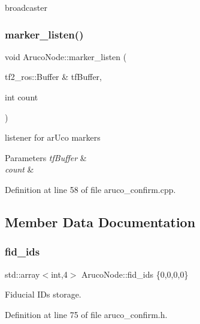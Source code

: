 broadcaster 

\mbox{\label{class_aruco_node_ad79fd951057c9a40f34fc159363fbd94}} 
\subsubsection{\texorpdfstring{marker\+\_\+listen()}{marker\_listen()}}
{\footnotesize\ttfamily void Aruco\+Node\+::marker\+\_\+listen (\begin{DoxyParamCaption}\item[{tf2\+\_\+ros\+::\+Buffer \&}]{tf\+Buffer,  }\item[{int}]{count }\end{DoxyParamCaption})}



listener for ar\+Uco markers 


\begin{DoxyParams}{Parameters}
{\em tf\+Buffer} & \\
\hline
{\em count} & \\
\hline
\end{DoxyParams}


Definition at line 58 of file aruco\+\_\+confirm.\+cpp.



\subsection{Member Data Documentation}
\mbox{\label{class_aruco_node_aa64bc8aad47d7569e315f5045ecaa7ac}} 
\subsubsection{\texorpdfstring{fid\+\_\+ids}{fid\_ids}}
{\footnotesize\ttfamily std\+::array$<$int,4$>$ Aruco\+Node\+::fid\+\_\+ids \{0,0,0,0\}}



Fiducial I\+Ds storage. 



Definition at line 75 of file aruco\+\_\+confirm.\+h.

\mbox{\label{class_aruco_node_a323a2a97fc30a4e6daf59d9577485569}} 
